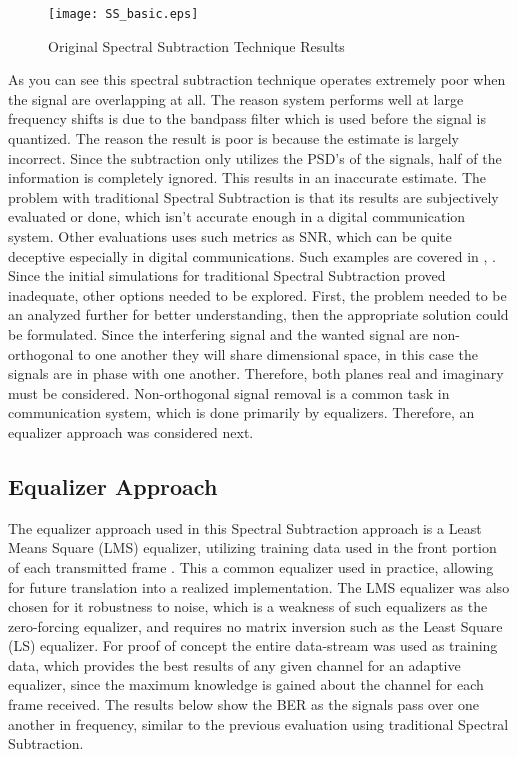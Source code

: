 \begin{figure}\label{SS_basic}
\centering
\texttt{[image: SS\_basic.eps]}
\caption{Original Spectral Subtraction Technique Results}
\end{figure} 

As you can see this spectral subtraction technique operates extremely poor when the signal are overlapping at all.  The reason system performs well at large frequency shifts is due to the bandpass filter which is used before the signal is quantized.  The reason the result is poor is because the estimate is largely incorrect.  Since the subtraction only utilizes the PSD's of the signals, half of the information is completely ignored.  This results in an inaccurate estimate.  The problem with traditional Spectral Subtraction is that its results are subjectively evaluated or done, which isn't accurate enough in a digital communication system.  Other evaluations uses such metrics as SNR, which can be quite deceptive especially in digital communications.  Such examples are covered in \cite{ss_subjective1}, \cite{ss_subjective2}. \\

Since the initial simulations for traditional Spectral Subtraction proved inadequate, other options needed to be explored.  First, the problem needed to be an analyzed further for better understanding, then the appropriate solution could be formulated.  Since the interfering signal and the wanted signal are non-orthogonal to one another they will share dimensional space, in this case the signals are in phase with one another.  Therefore, both planes real and imaginary must be considered.  Non-orthogonal signal removal is a common task in communication system, which is done primarily by equalizers.  Therefore, an equalizer approach was considered next.\\

\subsection{Equalizer Approach}

The equalizer approach used in this Spectral Subtraction approach is a Least Means Square (LMS) equalizer, utilizing training data used in the front portion of each transmitted frame \cite{9}.  This a common equalizer used in practice, allowing for future translation into a realized implementation.  The LMS equalizer was also chosen for it robustness to noise, which is a weakness of such equalizers as the zero-forcing equalizer, and requires no matrix inversion such as the Least Square (LS) equalizer.  For proof of concept the entire data-stream was used as training data, which provides the best results of any given channel for an adaptive equalizer, since the maximum knowledge is gained about the channel for each frame received.  The results below show the BER as the signals pass over one another in frequency, similar to the previous evaluation using traditional Spectral Subtraction.\\
  
